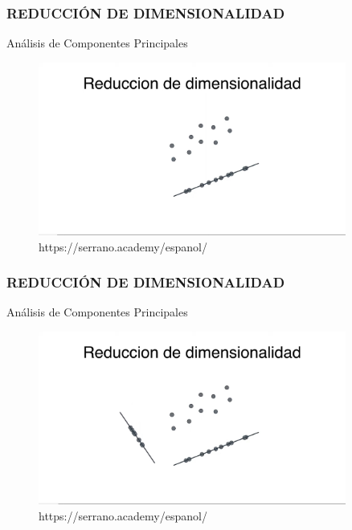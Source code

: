 \documentclass{beamer}
\begin{document}
\begin{frame}
	\frametitle{REDUCCIÓN DE DIMENSIONALIDAD}
	\begin{block}{Análisis de Componentes Principales}	
		\begin{figure}
			\includegraphics[width=0.9\textwidth]{PCA/IMG_3532.jpg}
			\caption{https://serrano.academy/espanol/}
		\end{figure}
	\end{block}
\end{frame}

\begin{frame}
	\frametitle{REDUCCIÓN DE DIMENSIONALIDAD}
	\begin{block}{Análisis de Componentes Principales}	
		\begin{figure}
			\includegraphics[width=0.9\textwidth]{PCA/IMG_3533.jpg}
			\caption{https://serrano.academy/espanol/}
		\end{figure}
	\end{block}
\end{frame}
\end{document}
